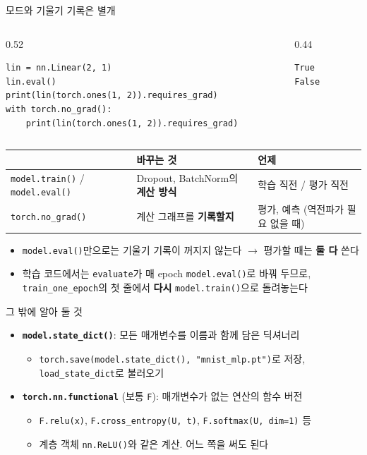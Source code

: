 \documentclass[aspectratio=169,11pt]{beamer}
\newcommand{\code}[1]{\texttt{#1}}
\begin{document}
\begin{frame}[fragile]{모드와 기울기 기록은 별개}
\begin{columns}[T,onlytextwidth]
\begin{column}{0.52\textwidth}
\begin{lstlisting}
lin = nn.Linear(2, 1)
lin.eval()
print(lin(torch.ones(1, 2)).requires_grad)
with torch.no_grad():
    print(lin(torch.ones(1, 2)).requires_grad)
\end{lstlisting}
\end{column}
\begin{column}{0.44\textwidth}
\begin{lstlisting}[style=outstyle]
True
False
\end{lstlisting}
\end{column}
\end{columns}
\vskip2mm
\centering
\footnotesize
\renewcommand{\arraystretch}{1.25}
\begin{tabular}{>{\raggedright}p{4.0cm}>{\raggedright}p{4.4cm}>{\raggedright\arraybackslash}p{4.4cm}}
\toprule
& \textbf{바꾸는 것} & \textbf{언제} \\
\midrule
\code{model.train()} / \code{model.eval()} & Dropout, BatchNorm의 \textbf{계산 방식} & 학습 직전 / 평가 직전 \\
\code{torch.no\_grad()} & 계산 그래프를 \textbf{기록할지} & 평가, 예측 (역전파가 필요 없을 때) \\
\bottomrule
\end{tabular}
\raggedright
\begin{itemize}
\item \code{model.eval()}만으로는 기울기 기록이 꺼지지 않는다 $\to$ 평가할 때는 \textbf{둘 다} 쓴다
\item 학습 코드에서는 \code{evaluate}가 매 epoch \code{model.eval()}로 바꿔 두므로,
\code{train\_one\_epoch}의 첫 줄에서 \textbf{다시} \code{model.train()}으로 돌려놓는다
\end{itemize}
\end{frame}

\begin{frame}{그 밖에 알아 둘 것}
\begin{itemize}
\item \textbf{\code{model.state\_dict()}}: 모든 매개변수를 이름과 함께 담은 딕셔너리
\begin{itemize}
\item \code{torch.save(model.state\_dict(), "mnist\_mlp.pt")}로 저장, \code{load\_state\_dict}로 불러오기
\end{itemize}
\item \textbf{\code{torch.nn.functional}} (보통 \code{F}): 매개변수가 없는 연산의 함수 버전
\begin{itemize}
\item \code{F.relu(x)}, \code{F.cross\_entropy(U, t)}, \code{F.softmax(U, dim=1)} 등
\item 계층 객체 \code{nn.ReLU()}와 같은 계산. 어느 쪽을 써도 된다
\end{itemize}
\end{itemize}
\end{frame}
\end{document}
